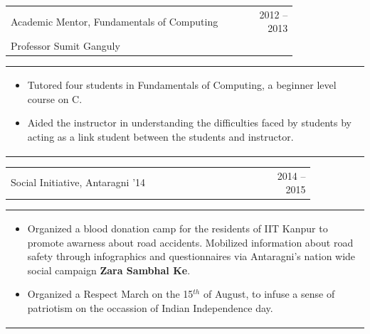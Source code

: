 \documentclass[a4paper,10pt]{article} %
\newcommand{\lproject}[4]{
    \begin{tabular}{p{0.80\linewidth}r}
        \textcolor{NavyBlue}{#2} & \multicolumn{1}{m{4cm}}{\raggedleft \textsc{#1}}\\
        #3
    \end{tabular}
    \begin{tabular}{p{\linewidth}}
    \vspace{-0.3cm}
        \footnotesize{#4}
    \end{tabular}
    \vspace{-0.5cm}
}
\newcommand{\iproject}[3]{
    \begin{tabular}{p{0.85\linewidth}r}
        \textcolor{NavyBlue}{#2} & \multicolumn{1}{m{3cm}}{\raggedleft \textsc{#1}}\\
    \end{tabular}
    \begin{tabular}{p{\linewidth}}
    \vspace{-0.3cm}
        \footnotesize{#3}
    \end{tabular}
    \vspace{-0.5cm}
}
\begin{document}
\lproject {2012 -- 2013}
          {Academic Mentor, Fundamentals of Computing}
          {Professor Sumit Ganguly}
          {
               \begin{itemize}[leftmargin=0.5cm]
                   \item Tutored four students in Fundamentals of Computing, a beginner level course on C.
                   \item Aided the instructor in understanding the difficulties faced by students by acting as a link
                       student between the students and instructor.
               \end{itemize}
          }

\iproject {2014 -- 2015}
          {Social Initiative, Antaragni '14}
          {
               \begin{itemize}[leftmargin=0.5cm]
                   \item Organized a blood donation camp for the residents of IIT Kanpur to promote awarness
                       about road accidents.  Mobilized information about road safety through infographics and questionnaires
                       via Antaragni's nation wide social campaign \textbf{Zara Sambhal Ke}.
                   \item Organized a Respect March on the 15$^{th}$ of August, to infuse a sense of patriotism
                       on the occassion of Indian Independence day.
               \end{itemize}
          }
\end{document}
